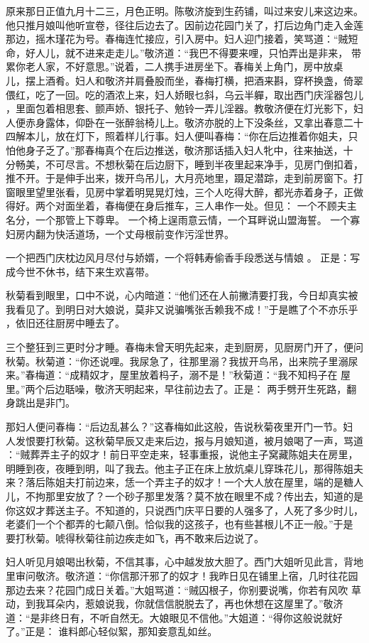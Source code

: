 原来那日正值九月十二三，月色正明。陈敬济旋到生药铺，叫过来安儿来这边来。
他只推月娘叫他听宣卷，径往后边去了。因前边花园门关了，打后边角门走入金莲
那边，摇木瑾花为号。春梅连忙接应，引入房中。妇人迎门接着，笑骂道：“贼短
命，好人儿，就不进来走走儿。”敬济道：“我巴不得要来哩，只怕弄出是非来，
带累你老人家，不好意思。”说着，二人携手进房坐下。春梅关上角门，房中放桌
儿，摆上酒肴。妇人和敬济并肩叠股而坐，春梅打横，把酒来斟，穿杯换盏，倚翠
偎红，吃了一回。吃的酒浓上来，妇人娇眼乜斜，乌云半軃，取出西门庆淫器包儿
，里面包着相思套、颤声娇、银托子、勉铃一弄儿淫器。教敬济便在灯光影下，妇
人便赤身露体，仰卧在一张醉翁椅儿上。敬济亦脱的上下没条丝，又拿出春意二十
四解本儿，放在灯下，照着样儿行事。妇人便叫春梅：“你在后边推着你姐夫，只
怕他身子乏了。”那春梅真个在后边推送，敬济那话插入妇人牝中，往来抽送，十
分畅美，不可尽言。不想秋菊在后边厨下，睡到半夜里起来净手，见房门倒扣着，
推不开。于是伸手出来，拨开鸟吊儿，大月亮地里，蹑足潜踪，走到前房窗下。打
窗眼里望里张看，见房中掌着明晃晃灯烛，三个人吃得大醉，都光赤着身子，正做
得好。两个对面坐着，春梅便在身后推车，三人串作一处。但见：
一个不顾夫主名分，一个那管上下尊卑。
一个椅上逞雨意云情，一个耳畔说山盟海誓。
一个寡妇房内翻为快活道场，一个丈母根前变作污淫世界。

一个把西门庆枕边风月尽付与娇婿，一个将韩寿偷香手段悉送与情娘
。
正是：写成今世不休书，结下来生欢喜带。

秋菊看到眼里，口中不说，心内暗道：“他们还在人前撇清要打我，今日却真实被
我看见了。到明日对大娘说，莫非又说骗嘴张舌赖我不成！”于是瞧了个不亦乐乎
，依旧还往厨房中睡去了。

三个整狂到三更时分才睡。春梅未曾天明先起来，走到厨房，见厨房门开了，便问
秋菊。秋菊道：“你还说哩。我尿急了，往那里溺？我拔开鸟吊，出来院子里溺尿
来。”春梅道：“成精奴才，屋里放着杩子，溺不是！”秋菊道：“我不知杩子在
屋里。”两个后边聒噪，敬济天明起来，早往前边去了。正是：
两手劈开生死路，翻身跳出是非门。

那妇人便问春梅：“后边乱甚么？”这春梅如此这般，告说秋菊夜里开门一节。妇
人发恨要打秋菊。这秋菊早辰又走来后边，报与月娘知道，被月娘喝了一声，骂道
：“贼葬弄主子的奴才！前日平空走来，轻事重报，说他主子窝藏陈姐夫在房里，
明睡到夜，夜睡到明，叫了我去。他主子正在床上放炕桌儿穿珠花儿，那得陈姐夫
来？落后陈姐夫打前边来，恁一个弄主子的奴才！一个大人放在屋里，端的是糖人
儿，不拘那里安放了？一个砂子那里发落？莫不放在眼里不成？传出去，知道的是
你这奴才葬送主子。不知道的，只说西门庆平日要的人强多了，人死了多少时儿，
老婆们一个个都弄的七颠八倒。恰似我的这孩子，也有些甚根儿不正一般。”于是
要打秋菊。唬得秋菊往前边疾走如飞，再不敢来后边说了。

妇人听见月娘喝出秋菊，不信其事，心中越发放大胆了。西门大姐听见此言，背地
里审问敬济。敬济道：“你信那汗邪了的奴才！我昨日见在铺里上宿，几时往花园
那边去来？花园门成日关着。”大姐骂道：“贼囚根子，你别要说嘴，你若有风吹
草动，到我耳朵内，惹娘说我，你就信信脱脱去了，再也休想在这屋里了。”敬济
道：“是非终日有，不听自然无。大娘眼见不信他。”大姐道：“得你这般说就好
了。”正是：
谁料郎心轻似絮，那知妾意乱如丝。